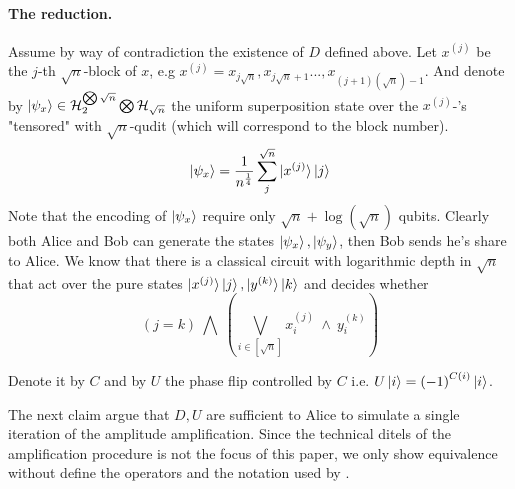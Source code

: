\documentclass{article}
\begin{document}
\paragraph{The reduction.} 
Assume by way of contradiction the existence of $D$ defined above.  
Let \( x^{(j)} \) be the \(j\)-th \(\sqrt{n}\)-block of \(x\), e.g \(x^{(j)} = x_{j\sqrt{n}},x_{j\sqrt{n}+1}...,x_{(j+1)(\sqrt{n})-1}  \). And denote by \( \ket{\psi_x} \in \mathcal{H}_{2}^{\bigotimes \sqrt{n}} \bigotimes \mathcal{H}_{\sqrt{n}} \) the uniform superposition state over the \( x^{(j)}\)-'s "tensored" with \(\sqrt{n}\)-qudit (which will correspond to the block number). 
\[ \ket{\psi_x} = \frac{1}{n^\frac{1}{4}}\sum_{j}^{\sqrt{n}}\ket{x^{(j)}}\ket{j} \] Note that the encoding of \( \ket{\psi_x} \) require only \( \sqrt{n} + \log(\sqrt{n}) \) qubits.
Clearly both Alice and Bob can generate the states \( \ket{\psi_x}, \ket{\psi_y} \), then Bob sends he's share to Alice.
We know that there is a classical circuit with logarithmic depth in \( \sqrt{n} \) that act over the pure states \( \ket{x^{(j)}}\ket{j} , \ket{y^{(k)}}\ket{k} \) and decides whether \[ \left( j =  k \right) \ \bigwedge  \ \left( \bigvee_{i \in [ \sqrt{n} ] } x^{(j)}_{i} \ \wedge \  y^{(k)}_{i} \right)   \]


Denote it by \( C \) and by \( U \) the phase flip controlled by $C$ i.e. $U\ket{i}=\left( -1 \right)^{C\left( i \right)}\ket{i}$. 

The next claim argue that $D,U$ are sufficient to Alice to simulate a single iteration of the amplitude amplification. Since the technical ditels of the amplification procedure is not the focus of this paper, we only show equivalence without define the operators and the notation used by \cite{Brassard_2002}.   
\end{document}
